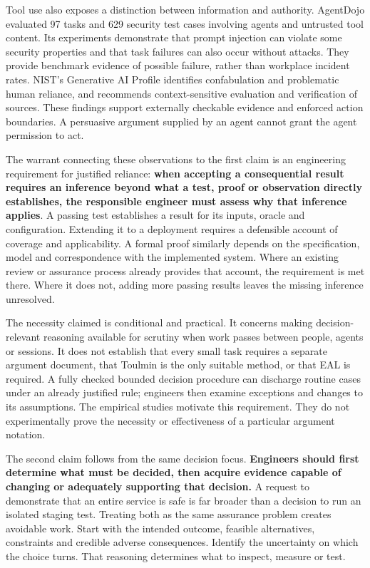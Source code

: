\documentclass[11pt,a4paper]{article}
\begin{document}
Tool use also exposes a distinction between information and authority. AgentDojo evaluated 97 tasks and 629 security test cases involving agents and untrusted tool content. Its experiments demonstrate that prompt injection can violate some security properties and that task failures can also occur without attacks. They provide benchmark evidence of possible failure, rather than workplace incident rates.\cite{agentdojo} NIST's Generative AI Profile identifies confabulation and problematic human reliance, and recommends context-sensitive evaluation and verification of sources.\cite{genai} These findings support externally checkable evidence and enforced action boundaries. A persuasive argument supplied by an agent cannot grant the agent permission to act.

The warrant connecting these observations to the first claim is an engineering requirement for justified reliance: \textbf{when accepting a consequential result requires an inference beyond what a test, proof or observation directly establishes, the responsible engineer must assess why that inference applies}. A passing test establishes a result for its inputs, oracle and configuration. Extending it to a deployment requires a defensible account of coverage and applicability. A formal proof similarly depends on the specification, model and correspondence with the implemented system. Where an existing review or assurance process already provides that account, the requirement is met there. Where it does not, adding more passing results leaves the missing inference unresolved.

The necessity claimed is conditional and practical. It concerns making decision-relevant reasoning available for scrutiny when work passes between people, agents or sessions. It does not establish that every small task requires a separate argument document, that Toulmin is the only suitable method, or that EAL is required. A fully checked bounded decision procedure can discharge routine cases under an already justified rule; engineers then examine exceptions and changes to its assumptions. The empirical studies motivate this requirement. They do not experimentally prove the necessity or effectiveness of a particular argument notation.

The second claim follows from the same decision focus. \textbf{Engineers should first determine what must be decided, then acquire evidence capable of changing or adequately supporting that decision.} A request to demonstrate that an entire service is safe is far broader than a decision to run an isolated staging test. Treating both as the same assurance problem creates avoidable work. Start with the intended outcome, feasible alternatives, constraints and credible adverse consequences. Identify the uncertainty on which the choice turns. That reasoning determines what to inspect, measure or test.
\end{document}
